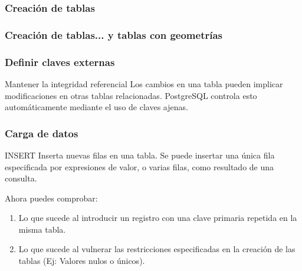 \documentclass{classes/beamer_GeomaticaUA}
\begin{document}
\begin{frame}[fragile]
\frametitle{Creación de tablas}


\end{frame}


\begin{frame}[fragile]
\frametitle{Creación de tablas... y tablas con geometrías}






\end{frame}

\begin{frame}[fragile]
\frametitle{Definir claves externas}

\begin{block}{Mantener la integridad referencial}
Los cambios en una tabla pueden implicar modificaciones en otras tablas relacionadas. PostgreSQL controla esto automáticamente mediante el uso de claves ajenas.
\end{block}



\end{frame}



\begin{frame}[fragile]
\frametitle{Carga de datos}
\begin{block}{INSERT}
Inserta nuevas filas en una tabla. Se puede insertar una única fila especificada por expresiones de valor, o varias filas, como resultado de una consulta.
\end{block}



Ahora puedes comprobar:
\begin{enumerate}
\item Lo que sucede al introducir un registro con una clave primaria repetida en la misma tabla.
\item Lo que sucede al vulnerar las restricciones especificadas en la creación de las tablas (Ej: Valores nulos o únicos).
\end{enumerate}

\end{frame}
\end{document}
